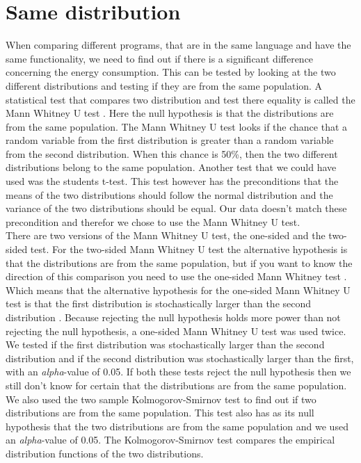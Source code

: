 \section{Same distribution}
When comparing different programs, that are in the same language and have the same functionality, we need to find out if there is a significant difference concerning the energy consumption. This can be tested by looking at the two different distributions and testing if they are from the same population. A statistical test that compares two distribution and test there equality is called the Mann Whitney U test \cite{mann1947test}. Here the null hypothesis is that the distributions are from the same population. The Mann Whitney U test looks if the chance that a random variable from the first distribution is greater than a random variable from the second distribution. When this chance is 50\%, then the two different distributions belong to the same population. Another test that we could have used was the students t-test. This test however has the preconditions that the means of the two distributions should follow the normal distribution and the variance of the two distributions should be equal. Our data doesn't match these precondition and therefor we chose to use the Mann Whitney U test.\\

There are two versions of the Mann Whitney U test, the one-sided and the two-sided test. For the two-sided Mann Whitney U test the alternative hypothesis is that the distributions are from the same population, but if you want to know the direction of this comparison you need to use the one-sided Mann Whitney test \cite{nachar2008mann}. Which means that the alternative hypothesis for the one-sided Mann Whitney U test is that the first distribution is stochastically larger than the second distribution \cite{nachar2008mann}. Because rejecting the null hypothesis holds more power than not rejecting the null hypothesis, a one-sided Mann Whitney U test was used twice. We tested if the first distribution was stochastically larger than the second distribution and if the second distribution was stochastically larger than the first, with an  \textit{alpha}-value of 0.05. If both these tests reject the null hypothesis then we still don't know for certain that the distributions are from the same population.\\

We also used the two sample Kolmogorov-Smirnov test to find out if two distributions are from the same population. This test also has as its null hypothesis that the two distributions are from the same population and we used an \textit{alpha}-value of 0.05. The Kolmogorov-Smirnov test compares the empirical distribution functions of the two distributions.

